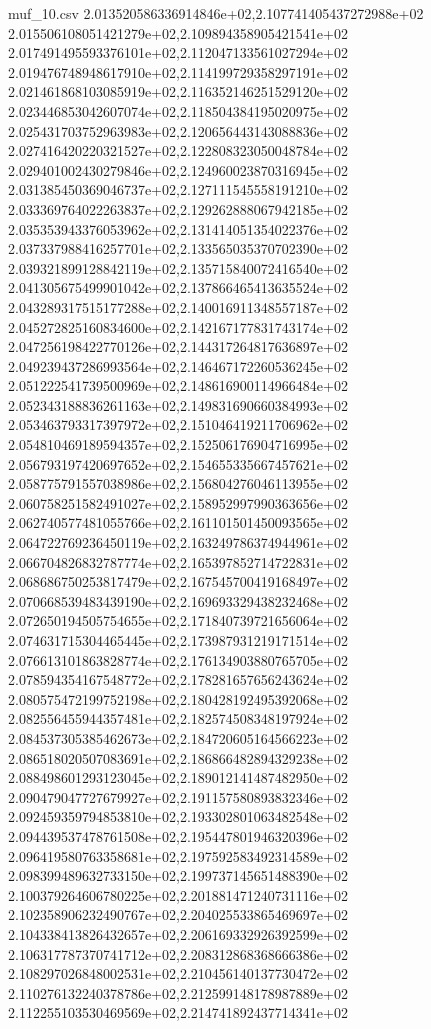 \begin{filecontents*}{muf_10.csv}
2.013520586336914846e+02,2.107741405437272988e+02
2.015506108051421279e+02,2.109894358905421541e+02
2.017491495593376101e+02,2.112047133561027294e+02
2.019476748948617910e+02,2.114199729358297191e+02
2.021461868103085919e+02,2.116352146251529120e+02
2.023446853042607074e+02,2.118504384195020975e+02
2.025431703752963983e+02,2.120656443143088836e+02
2.027416420220321527e+02,2.122808323050048784e+02
2.029401002430279846e+02,2.124960023870316945e+02
2.031385450369046737e+02,2.127111545558191210e+02
2.033369764022263837e+02,2.129262888067942185e+02
2.035353943376053962e+02,2.131414051354022376e+02
2.037337988416257701e+02,2.133565035370702390e+02
2.039321899128842119e+02,2.135715840072416540e+02
2.041305675499901042e+02,2.137866465413635524e+02
2.043289317515177288e+02,2.140016911348557187e+02
2.045272825160834600e+02,2.142167177831743174e+02
2.047256198422770126e+02,2.144317264817636897e+02
2.049239437286993564e+02,2.146467172260536245e+02
2.051222541739500969e+02,2.148616900114966484e+02
2.052343188836261163e+02,2.149831690660384993e+02
2.053463793317397972e+02,2.151046419211706962e+02
2.054810469189594357e+02,2.152506176904716995e+02
2.056793197420697652e+02,2.154655335667457621e+02
2.058775791557038986e+02,2.156804276046113955e+02
2.060758251582491027e+02,2.158952997990363656e+02
2.062740577481055766e+02,2.161101501450093565e+02
2.064722769236450119e+02,2.163249786374944961e+02
2.066704826832787774e+02,2.165397852714722831e+02
2.068686750253817479e+02,2.167545700419168497e+02
2.070668539483439190e+02,2.169693329438232468e+02
2.072650194505754655e+02,2.171840739721656064e+02
2.074631715304465445e+02,2.173987931219171514e+02
2.076613101863828774e+02,2.176134903880765705e+02
2.078594354167548772e+02,2.178281657656243624e+02
2.080575472199752198e+02,2.180428192495392068e+02
2.082556455944357481e+02,2.182574508348197924e+02
2.084537305385462673e+02,2.184720605164566223e+02
2.086518020507083691e+02,2.186866482894329238e+02
2.088498601293123045e+02,2.189012141487482950e+02
2.090479047727679927e+02,2.191157580893832346e+02
2.092459359794853810e+02,2.193302801063482548e+02
2.094439537478761508e+02,2.195447801946320396e+02
2.096419580763358681e+02,2.197592583492314589e+02
2.098399489632733150e+02,2.199737145651488390e+02
2.100379264606780225e+02,2.201881471240731116e+02
2.102358906232490767e+02,2.204025533865469697e+02
2.104338413826432657e+02,2.206169332926392599e+02
2.106317787370741712e+02,2.208312868368666386e+02
2.108297026848002531e+02,2.210456140137730472e+02
2.110276132240378786e+02,2.212599148178987889e+02
2.112255103530469569e+02,2.214741892437714341e+02

\end{filecontents*}
